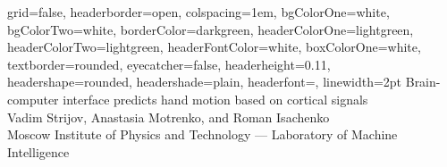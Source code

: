 \documentclass[a0paper,portrait]{baposter}
\begin{document}

\begin{poster}
{
grid=false,
headerborder=open, %
colspacing=1em, %
bgColorOne=white, %
bgColorTwo=white, %
borderColor=darkgreen, %
headerColorOne=lightgreen, %
headerColorTwo=lightgreen, %
headerFontColor=white, %
boxColorOne=white, %
textborder=rounded, %
eyecatcher=false, %
headerheight=0.11\textheight, %
headershape=rounded, %
headershade=plain,
headerfont=\Large\textsf, %
linewidth=2pt %
}
{}
%
%
{
\textsf %
{Brain-computer interface predicts hand motion based on cortical signals
}
} %
{\sf\vspace{0.2em}\\
Vadim Strijov, Anastasia Motrenko, and Roman Isachenko
\vspace{0.1em}\\
\small{ Moscow Institute of Physics and Technology --- 
Laboratory of Machine Intelligence\\
}}
\end{poster}
\end{document}
